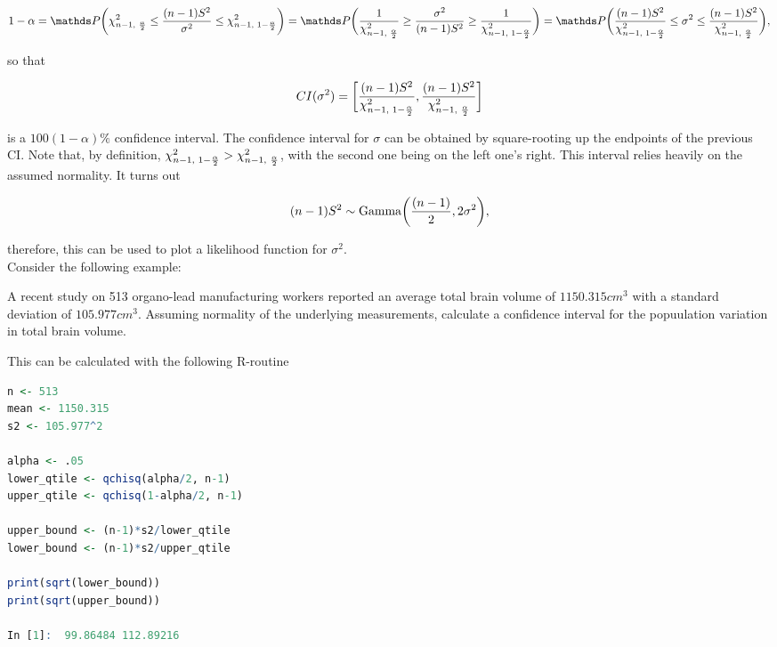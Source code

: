 \documentclass{homework}
\begin{document}
$$
1-\alpha = \prob\bigg(\chi^2_{n-1, \textnormal{ }\frac{\alpha}{2}} \leq \frac{(n-1)S^2}{\sigma^2} \leq \chi^2_{n-1, \textnormal{ }1-\frac{\alpha}{2}} \bigg) \\
= \prob\bigg(\frac{1}{\chi^2_{n-1, \textnormal{ }\frac{\alpha}{2}}} \geq \frac{\sigma^2}{(n-1)S^2} \geq \frac{1}{\chi^2_{n-1, \textnormal{ }1-\frac{\alpha}{2}}} \bigg) \\
= \prob\bigg(\frac{(n-1)S^2}{\chi^2_{n-1, \textnormal{ }1-\frac{\alpha}{2}}} \leq {\sigma^2} \leq \frac{(n-1)S^2}{\chi^2_{n-1, \textnormal{ }\frac{\alpha}{2}}} \bigg),
$$

so that 

$$
CI(\sigma^2) = \bigg[\frac{(n-1)S^2}{\chi^2_{n-1, \textnormal{ }1-\frac{\alpha}{2}}}, \frac{(n-1)S^2}{\chi^2_{n-1, \textnormal{ }\frac{\alpha}{2}}}\bigg] 
$$

is a $100(1-\alpha)\%$ confidence interval. The confidence interval for $\sigma$ can be obtained by square-rooting up the endpoints of the previous CI. Note that, by definition, $\chi^2_{n-1, \textnormal{ }1-\frac{\alpha}{2}} > \chi^2_{n-1, \textnormal{ }\frac{\alpha}{2}}$, with the second one being on the left one's right. This interval relies heavily on the assumed normality. It turns out 

$$
(n-1)S^2 \sim \textnormal{Gamma}\bigg(\frac{(n-1)}{2}, 2\sigma^2\bigg),
$$

therefore, this can be used to plot a likelihood function for $\sigma^2$. \\

Consider the following example:

\begin{tcolorbox}[title=Example of \chidis CI]

A recent study on 513 organo-lead manufacturing workers reported an average total brain volume of $1150.315 cm^3$ with a standard deviation of $105.977 cm^3$. Assuming normality of the underlying measurements, calculate a confidence interval for the popuulation variation in total brain volume. 

\end{tcolorbox}

This can be calculated with the following R-routine

\begin{lstlisting}[language=R]
n <- 513
mean <- 1150.315
s2 <- 105.977^2 

alpha <- .05 
lower_qtile <- qchisq(alpha/2, n-1)
upper_qtile <- qchisq(1-alpha/2, n-1)

upper_bound <- (n-1)*s2/lower_qtile
lower_bound <- (n-1)*s2/upper_qtile

print(sqrt(lower_bound))
print(sqrt(upper_bound))

In [1]:  99.86484 112.89216
\end{lstlisting}
\end{document}
